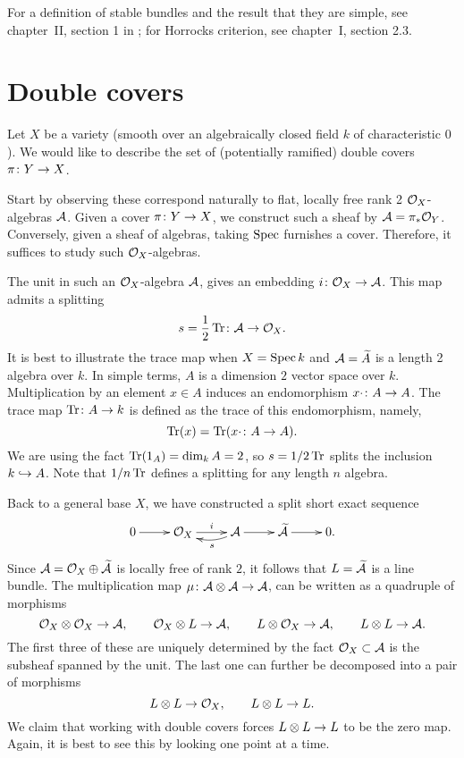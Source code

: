 For a definition of stable bundles and the result that they are simple, see chapter~II, section 1 in \cite{OSS-Vector-bundles}; for Horrocks criterion, see chapter~I, section 2.3.  


\section{Double covers}

Let $X$ be a variety (smooth over an algebraically closed field $k$ of characteristic $0$). We would like to describe the set of (potentially ramified) double covers $\pi \cn Y \rarr X$.

Start by observing these correspond naturally to flat, locally free rank 2 $\mathcal{O}_X$-algebras $\mathcal{A}$. Given a cover $\pi \cn Y \rarr X$, we construct such a sheaf by $\mathcal{A} = \pi_\ast \mathcal{O}_Y$. Conversely, given a sheaf of algebras, taking $\operatorname{Spec}$ furnishes a cover. Therefore, it suffices to study such $\mathcal{O}_X$-algebras.

The unit in such an $\mathcal{O}_X$-algebra $\mathcal{A}$, gives an embedding $i \cn \Oc_X \rarr \Ac$. This map admits a splitting
\[
s = \frac{1}{2} \Tr \cn \Ac \rarr \Oc_X.
\]
It is best to illustrate the trace map when $X = \operatorname{Spec} k$ and $\mathcal{A} = \widetilde{A}$ is a length 2 algebra over $k$. In simple terms, $A$ is a dimension $2$ vector space over $k$. Multiplication by an element $x \in A$ induces an endomorphism $x \cdot \cn A \rarr A$. The trace map $\Tr \cn A \rarr k$ is defined as the trace of this endomorphism, namely,
\[
\Tr(x) = \Tr( x \cdot \cn A \rarr A ).
\]
We are using the fact $\operatorname{Tr}(1_A) = \dim_k A = 2$, so $s = 1/2 \operatorname{Tr}$ splits the inclusion $k \hookrightarrow A$. Note that $1/n \operatorname{Tr}$ defines a splitting for any length $n$ algebra.

Back to a general base $X$, we have constructed a split short exact sequence
\[\xymatrix{
  0 \ar[r] &
  \Oc_X \ar[r]^-{i} &
  \Ac \ar@/^/[l]^-{s} \ar[r] &
  \wtilde{\Ac} \ar[r] &
  0.
}\]
Since $\mathcal{A} = \mathcal{O}_X \oplus \widetilde{\mathcal{A}}$ is locally free of rank $2$, it follows that $L = \widetilde{\mathcal{A}}$ is a line bundle. The multiplication map $\mu \cn \Ac \otimes \Ac \rarr \Ac$, can be written as a quadruple of morphisms
\[
\Oc_X \otimes \Oc_X \rarr \Ac, \qquad
\Oc_X \otimes L \rarr \Ac, \qquad
L \otimes \Oc_X \rarr \Ac, \qquad
L \otimes L \rarr \Ac.
\]
The first three of these are uniquely determined by the fact $\mathcal{O}_X \subset \mathcal{A}$ is the subsheaf spanned by the unit. The last one can further be decomposed into a pair of morphisms
\[
L \otimes L \rarr \Oc_X, \qquad
L \otimes L \rarr L.
\]
We claim that working with double covers forces $L \otimes L \rarr L$ to be the zero map. Again, it is best to see this by looking one point at a time.

